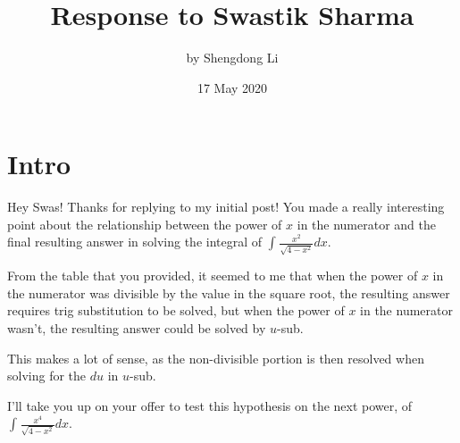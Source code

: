 \documentclass[letterpaper, 12pt]{article}
\begin{document}
\title{Response to Swastik Sharma}
\author{by Shengdong Li}
\date{17 May 2020}
\maketitle

\section{Intro}
Hey Swas! Thanks for replying to my initial post! You made a really interesting point about the relationship between the power of $x$ in the numerator and the final resulting answer in solving the integral of $\int_{ }^{ }\frac{x^{2}}{\sqrt{4-x^{2}}}dx$. \par
From the table that you provided, it seemed to me that when the power of $x$ in the numerator was divisible by the value in the square root, the resulting answer requires trig substitution to be solved, but when the power of $x$ in the numerator wasn't, the resulting answer could be solved by $u$-sub. \par
This makes a lot of sense, as the non-divisible portion is then resolved when solving for the $du$ in $u$-sub. \par
I'll take you up on your offer to test this hypothesis on the next power, of $\int_{ }^{ }\frac{x^{4}}{\sqrt{4-x^{2}}}dx$.
\end{document}
